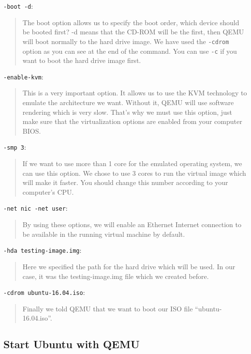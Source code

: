 \texttt{-boot\ -d}:

\begin{quote}
The boot option allows us to specify the boot order, which device should
be booted first? -d means that the CD-ROM will be the first, then QEMU
will boot normally to the hard drive image. We have used the
\texttt{-cdrom} option as you can see at the end of the command. You can
use \texttt{-c} if you want to boot the hard drive image first.
\end{quote}

\texttt{-enable-kvm}:

\begin{quote}
This is a very important option. It allows us to use the KVM technology
to emulate the architecture we want. Without it, QEMU will use software
rendering which is very slow. That's why we must use this option, just
make sure that the virtualization options are enabled from your computer
BIOS.
\end{quote}

\texttt{-smp\ 3}:

\begin{quote}
If we want to use more than 1 core for the emulated operating system, we
can use this option. We chose to use 3 cores to run the virtual image
which will make it faster. You should change this number according to
your computer's CPU.
\end{quote}

\texttt{-net\ nic\ -net\ user}:

\begin{quote}
By using these options, we will enable an Ethernet Internet connection
to be available in the running virtual machine by default.
\end{quote}

\texttt{-hda\ testing-image.img}:

\begin{quote}
Here we specified the path for the hard drive which will be used. In our
case, it was the testing-image.img file which we created before.
\end{quote}

\texttt{-cdrom\ ubuntu-16.04.iso}:

\begin{quote}
Finally we told QEMU that we want to boot our ISO file
``ubuntu-16.04.iso''.
\end{quote}

\hypertarget{start-ubuntu-with-qemu}{%
\subsection{Start Ubuntu with QEMU}\label{start-ubuntu-with-qemu}}

